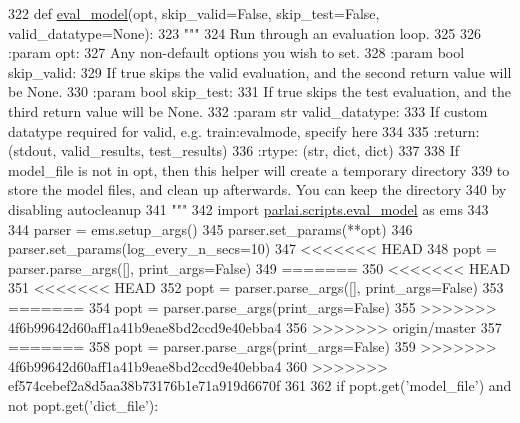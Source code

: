 \begin{DoxyCode}
322 \textcolor{keyword}{def }\hyperlink{namespaceparlai_1_1utils_1_1testing_ab5bd02c7b5ab42c393ddddf73d9c78d2}{eval\_model}(opt, skip\_valid=False, skip\_test=False, valid\_datatype=None):
323     \textcolor{stringliteral}{"""}
324 \textcolor{stringliteral}{    Run through an evaluation loop.}
325 \textcolor{stringliteral}{}
326 \textcolor{stringliteral}{    :param opt:}
327 \textcolor{stringliteral}{        Any non-default options you wish to set.}
328 \textcolor{stringliteral}{    :param bool skip\_valid:}
329 \textcolor{stringliteral}{        If true skips the valid evaluation, and the second return value will be None.}
330 \textcolor{stringliteral}{    :param bool skip\_test:}
331 \textcolor{stringliteral}{        If true skips the test evaluation, and the third return value will be None.}
332 \textcolor{stringliteral}{    :param str valid\_datatype:}
333 \textcolor{stringliteral}{        If custom datatype required for valid, e.g. train:evalmode, specify here}
334 \textcolor{stringliteral}{}
335 \textcolor{stringliteral}{    :return: (stdout, valid\_results, test\_results)}
336 \textcolor{stringliteral}{    :rtype: (str, dict, dict)}
337 \textcolor{stringliteral}{}
338 \textcolor{stringliteral}{    If model\_file is not in opt, then this helper will create a temporary directory}
339 \textcolor{stringliteral}{    to store the model files, and clean up afterwards. You can keep the directory}
340 \textcolor{stringliteral}{    by disabling autocleanup}
341 \textcolor{stringliteral}{    """}
342     \textcolor{keyword}{import} \hyperlink{namespaceparlai_1_1scripts_1_1eval__model}{parlai.scripts.eval\_model} \textcolor{keyword}{as} ems
343 
344     parser = ems.setup\_args()
345     parser.set\_params(**opt)
346     parser.set\_params(log\_every\_n\_secs=10)
347 <<<<<<< HEAD
348     popt = parser.parse\_args([], print\_args=\textcolor{keyword}{False})
349 =======
350 <<<<<<< HEAD
351 <<<<<<< HEAD
352     popt = parser.parse\_args([], print\_args=\textcolor{keyword}{False})
353 =======
354     popt = parser.parse\_args(print\_args=\textcolor{keyword}{False})
355 >>>>>>> 4f6b99642d60aff1a41b9eae8bd2ccd9e40ebba4
356 >>>>>>> origin/master
357 =======
358     popt = parser.parse\_args(print\_args=\textcolor{keyword}{False})
359 >>>>>>> 4f6b99642d60aff1a41b9eae8bd2ccd9e40ebba4
360 >>>>>>> ef574cebef2a8d5aa38b73176b1e71a919d6670f
361 
362     \textcolor{keywordflow}{if} popt.get(\textcolor{stringliteral}{'model\_file'}) \textcolor{keywordflow}{and} \textcolor{keywordflow}{not} popt.get(\textcolor{stringliteral}{'dict\_file'}):

\end{DoxyCode}

